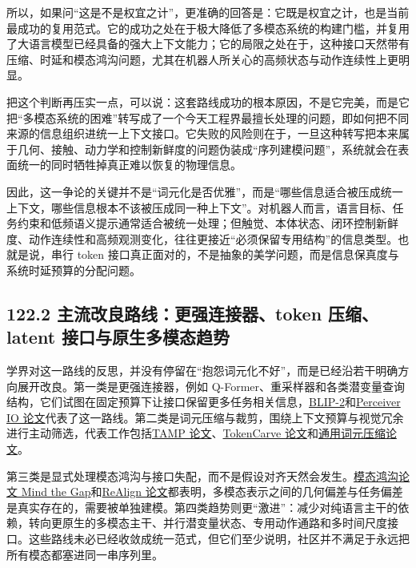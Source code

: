 所以，如果问“这是不是权宜之计”，更准确的回答是：它既是权宜之计，也是当前最成功的复用范式。它的成功之处在于极大降低了多模态系统的构建门槛，并复用了大语言模型已经具备的强大上下文能力；它的局限之处在于，这种接口天然带有压缩、时延和模态鸿沟问题，尤其在机器人所关心的高频状态与动作连续性上更明显。

把这个判断再压实一点，可以说：这套路线成功的根本原因，不是它完美，而是它把“多模态系统的困难”转写成了一个今天工程界最擅长处理的问题，即如何把不同来源的信息组织进统一上下文接口。它失败的风险则在于，一旦这种转写把本来属于几何、接触、动力学和控制新鲜度的问题伪装成“序列建模问题”，系统就会在表面统一的同时牺牲掉真正难以恢复的物理信息。

因此，这一争论的关键并不是“词元化是否优雅”，而是“哪些信息适合被压成统一上下文，哪些信息根本不该被压成同一种上下文”。对机器人而言，语言目标、任务约束和低频语义提示通常适合被统一处理；但触觉、本体状态、闭环控制新鲜度、动作连续性和高频观测变化，往往更接近“必须保留专用结构”的信息类型。也就是说，串行 token 接口真正面对的，不是抽象的美学问题，而是信息保真度与系统时延预算的分配问题。

\subsection*{122.2 主流改良路线：更强连接器、token 压缩、latent 接口与原生多模态趋势}


学界对这一路线的反思，并没有停留在“抱怨词元化不好”，而是已经沿若干明确方向展开改良。第一类是更强连接器，例如 Q-Former、重采样器和各类潜变量查询结构，它们试图在固定预算下让接口保留更多任务相关信息，\href{https://arxiv.org/abs/2301.12597}{BLIP-2}和\href{https://arxiv.org/abs/2107.14795}{Perceiver IO 论文}代表了这一路线。第二类是词元压缩与裁剪，围绕上下文预算与视觉冗余进行主动筛选，代表工作包括\href{https://arxiv.org/abs/2504.09897}{TAMP 论文}、\href{https://arxiv.org/abs/2503.10501}{TokenCarve 论文}和\href{https://arxiv.org/abs/2506.01097}{通用词元压缩论文}。

第三类是显式处理模态鸿沟与接口失配，而不是假设对齐天然会发生。\href{https://arxiv.org/abs/2203.02053}{模态鸿沟论文 Mind the Gap}和\href{https://arxiv.org/abs/2602.07026}{ReAlign 论文}都表明，多模态表示之间的几何偏差与任务偏差是真实存在的，需要被单独建模。第四类趋势则更“激进”：减少对纯语言主干的依赖，转向更原生的多模态主干、并行潜变量状态、专用动作通路和多时间尺度接口。这些路线未必已经收敛成统一范式，但它们至少说明，社区并不满足于永远把所有模态都塞进同一串序列里。

